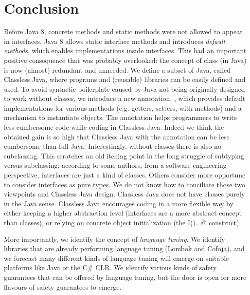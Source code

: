 \section{Conclusion}\label{sec:conclusion}

Before Java 8, concrete methods and static methods were not allowed
to appear in interfaces.  Java 8 allows static interface methods and
introduces \emph{default methods}, which enables implementations
inside interfaces. This had an important positive consequence that
was probably overlooked: the concept of class
(in Java) is now (almost) redundant and unneeded.  We define a subset of Java,
called Classless Java, where programs and (reusable) libraries can be
easily defined and used.  To avoid syntactic boilerplate
caused by Java not being originally designed to work without classes,
we introduce a new annotation, \mixin, which provides default implementations
for various methods (e.g. getters, setters, with-methods) and a
mechanism to instantiate objects. The \mixin annotation helps programmers
to write less cumbersome code while coding in Classless Java. Indeed
we think the obtained gain is so high that Classless Java with the \mixin
annotation can be less cumbersome than full Java.
Interestingly, without classes there is also no subclassing. This scratches an old
  itching point in the long struggle of subtyping versus subclassing:
  according to some authors, from a software engineering perspective,
  interfaces are just a kind of classes. Others consider more
  opportune to consider interfaces as pure types. We do not know how to conciliate
  those two viewpoints and Classless Java design.
  Classless Java does not have classes purely in the Java sense.  
 Classless Java encourages coding in a more flexible way by either
 keeping a higher abstraction level (interfaces are a more abstract
 concept than classes), or relying on concrete object initialization
 (the \Q@new I(){...}@ construct).
 
 More importantly, we identify the concept of \emph{language tuning}.
 We identify libraries that are already performing language tuning (Lombok and Cofoja), and 
 we forecast many different kinds of language tuning will emerge on suitable platforms like Java or the C\# CLR.
 We identify various kinds of safety guarantees that can be offered by language tuning, but the door is open for more flavours of safety guarantees to emerge.
